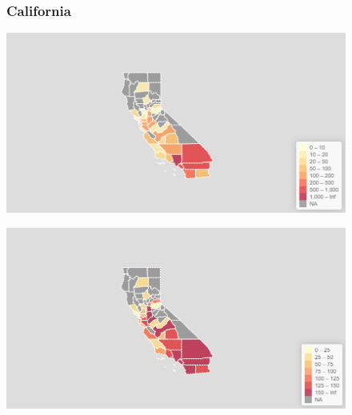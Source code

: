 \documentclass[11pt]{article}
\begin{document}
\begin{landscape}
\thispagestyle{empty}
\begin{figure}[h]
\subsubsection*{California}
\hspace*{-3cm}
\begin{minipage}{.8\textwidth}
    \includegraphics[width=.95\textwidth]{ImageResults/CaliforniaTotal.PNG}
\end{minipage}%
\begin{minipage}{.8\textwidth}
    \includegraphics[width=.95\textwidth]{ImageResults/California100k.PNG}
    \label{fig:Cali100k}
\end{minipage}

\end{figure}
\end{landscape}
\end{document}
